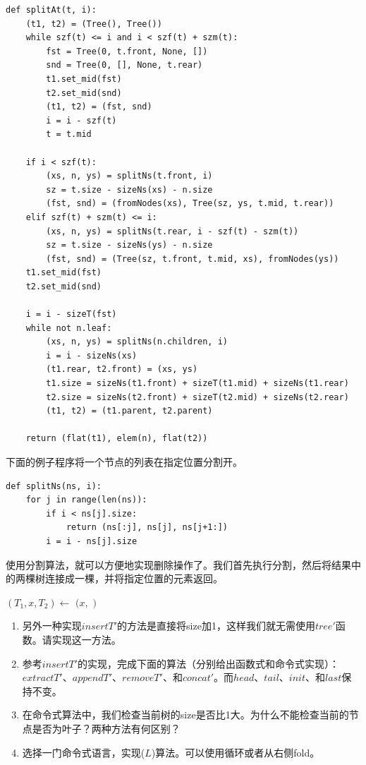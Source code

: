 \documentclass[b5paper]{ctexart}
\begin{document}
\lstset{language=Python}
\begin{lstlisting}
def splitAt(t, i):
    (t1, t2) = (Tree(), Tree())
    while szf(t) <= i and i < szf(t) + szm(t):
        fst = Tree(0, t.front, None, [])
        snd = Tree(0, [], None, t.rear)
        t1.set_mid(fst)
        t2.set_mid(snd)
        (t1, t2) = (fst, snd)
        i = i - szf(t)
        t = t.mid

    if i < szf(t):
        (xs, n, ys) = splitNs(t.front, i)
        sz = t.size - sizeNs(xs) - n.size
        (fst, snd) = (fromNodes(xs), Tree(sz, ys, t.mid, t.rear))
    elif szf(t) + szm(t) <= i:
        (xs, n, ys) = splitNs(t.rear, i - szf(t) - szm(t))
        sz = t.size - sizeNs(ys) - n.size
        (fst, snd) = (Tree(sz, t.front, t.mid, xs), fromNodes(ys))
    t1.set_mid(fst)
    t2.set_mid(snd)

    i = i - sizeT(fst)
    while not n.leaf:
        (xs, n, ys) = splitNs(n.children, i)
        i = i - sizeNs(xs)
        (t1.rear, t2.front) = (xs, ys)
        t1.size = sizeNs(t1.front) + sizeT(t1.mid) + sizeNs(t1.rear)
        t2.size = sizeNs(t2.front) + sizeT(t2.mid) + sizeNs(t2.rear)
        (t1, t2) = (t1.parent, t2.parent)

    return (flat(t1), elem(n), flat(t2))
\end{lstlisting}

下面的例子程序将一个节点的列表在指定位置分割开。

\begin{lstlisting}
def splitNs(ns, i):
    for j in range(len(ns)):
        if i < ns[j].size:
            return (ns[:j], ns[j], ns[j+1:])
        i = i - ns[j].size
\end{lstlisting}

使用分割算法，就可以方便地实现删除操作了。我们首先执行分割，然后将结果中的两棵树连接成一棵，并将指定位置的元素返回。

\begin{algorithmic}
  \State $(T_1, x, T_2) \gets$ 
  \State \Return $(x, $  $)$
\EndFunction
\end{algorithmic}

\begin{Exercise}
\begin{enumerate}
\item 另外一种实现$insertT'$的方法是直接将size加1，这样我们就无需使用$tree'$函数。请实现这一方法。

\item 参考$insertT'$的实现，完成下面的算法（分别给出函数式和命令式实现）：$extractT'$、$appendT'$、$removeT'$、和$concat'$。而$head$、$tail$、$init$、和$last$保持不变。

\item 在命令式算法中，我们检查当前树的size是否比1大。为什么不能检查当前的节点是否为叶子？两种方法有何区别？

\item 选择一门命令式语言，实现($L$)算法。可以使用循环或者从右侧fold。
\end{enumerate}
\end{Exercise}
\end{document}
